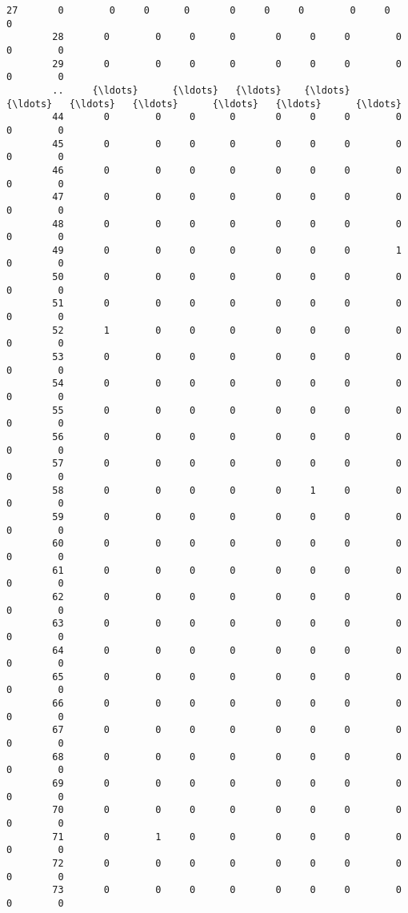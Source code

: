 \documentclass[11pt]{article}
\begin{document}
\begin{Verbatim}[commandchars=\\\{\}]
        27       0        0     0      0       0     0     0        0     0        0   
        28       0        0     0      0       0     0     0        0     0        0   
        29       0        0     0      0       0     0     0        0     0        0   
        ..     {\ldots}      {\ldots}   {\ldots}    {\ldots}     {\ldots}   {\ldots}   {\ldots}      {\ldots}   {\ldots}      {\ldots}   
        44       0        0     0      0       0     0     0        0     0        0   
        45       0        0     0      0       0     0     0        0     0        0   
        46       0        0     0      0       0     0     0        0     0        0   
        47       0        0     0      0       0     0     0        0     0        0   
        48       0        0     0      0       0     0     0        0     0        0   
        49       0        0     0      0       0     0     0        1     0        0   
        50       0        0     0      0       0     0     0        0     0        0   
        51       0        0     0      0       0     0     0        0     0        0   
        52       1        0     0      0       0     0     0        0     0        0   
        53       0        0     0      0       0     0     0        0     0        0   
        54       0        0     0      0       0     0     0        0     0        0   
        55       0        0     0      0       0     0     0        0     0        0   
        56       0        0     0      0       0     0     0        0     0        0   
        57       0        0     0      0       0     0     0        0     0        0   
        58       0        0     0      0       0     1     0        0     0        0   
        59       0        0     0      0       0     0     0        0     0        0   
        60       0        0     0      0       0     0     0        0     0        0   
        61       0        0     0      0       0     0     0        0     0        0   
        62       0        0     0      0       0     0     0        0     0        0   
        63       0        0     0      0       0     0     0        0     0        0   
        64       0        0     0      0       0     0     0        0     0        0   
        65       0        0     0      0       0     0     0        0     0        0   
        66       0        0     0      0       0     0     0        0     0        0   
        67       0        0     0      0       0     0     0        0     0        0   
        68       0        0     0      0       0     0     0        0     0        0   
        69       0        0     0      0       0     0     0        0     0        0   
        70       0        0     0      0       0     0     0        0     0        0   
        71       0        1     0      0       0     0     0        0     0        0   
        72       0        0     0      0       0     0     0        0     0        0   
        73       0        0     0      0       0     0     0        0     0        0   
        

\end{Verbatim}
\end{document}
